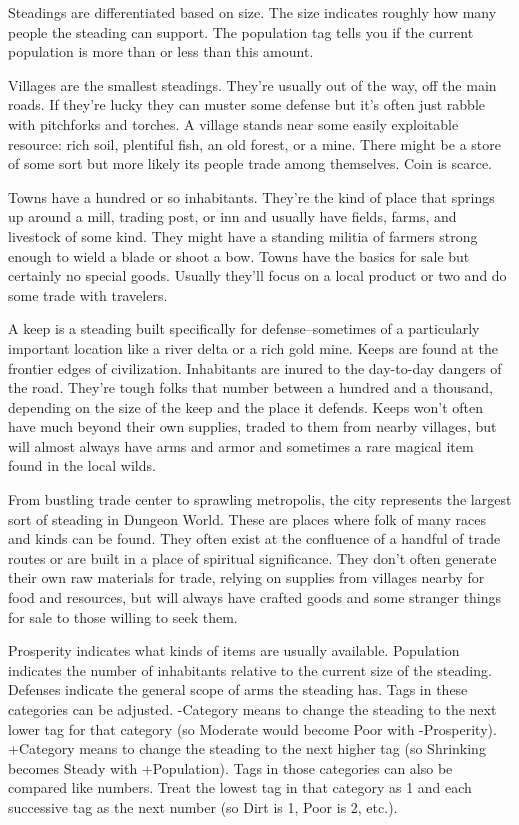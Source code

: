  Steadings are differentiated based on size. The size indicates roughly how many people the steading can support. The population tag tells you if the current population is more than or less than this amount.


 Villages are the smallest steadings. They're usually out of the way, off the main roads. If they're lucky they can muster some defense but it's often just rabble with pitchforks and torches. A village stands near some easily exploitable resource: rich soil, plentiful fish, an old forest, or a mine. There might be a store of some sort but more likely its people trade among themselves. Coin is scarce.


 Towns have a hundred or so inhabitants. They're the kind of place that springs up around a mill, trading post, or inn and usually have fields, farms, and livestock of some kind. They might have a standing militia of farmers strong enough to wield a blade or shoot a bow. Towns have the basics for sale but certainly no special goods. Usually they'll focus on a local product or two and do some trade with travelers.


 A keep is a steading built specifically for defense--sometimes of a particularly important location like a river delta or a rich gold mine. Keeps are found at the frontier edges of civilization. Inhabitants are inured to the day-to-day dangers of the road. They're tough folks that number between a hundred and a thousand, depending on the size of the keep and the place it defends. Keeps won't often have much beyond their own supplies, traded to them from nearby villages, but will almost always have arms and armor and sometimes a rare magical item found in the local wilds.


 From bustling trade center to sprawling metropolis, the city represents the largest sort of steading in Dungeon World. These are places where folk of many races and kinds can be found. They often exist at the confluence of a handful of trade routes or are built in a place of spiritual significance. They don't often generate their own raw materials for trade, relying on supplies from villages nearby for food and resources, but will always have crafted goods and some stranger things for sale to those willing to seek them.


 Prosperity indicates what kinds of items are usually available. Population indicates the number of inhabitants relative to the current size of the steading. Defenses indicate the general scope of arms the steading has. Tags in these categories can be adjusted. -Category means to change the steading to the next lower tag for that category (so Moderate would become Poor with -Prosperity). +Category means to change the steading to the next higher tag (so Shrinking becomes Steady with +Population). Tags in those categories can also be compared like numbers. Treat the lowest tag in that category as 1 and each successive tag as the next number (so Dirt is 1, Poor is 2, etc.).



